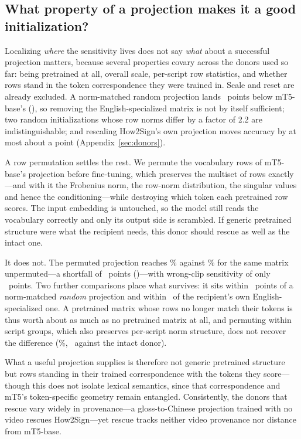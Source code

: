 \documentclass[11pt]{article}
\begin{document}
\subsection{What property of a projection makes it a good initialization?}
\label{sec:mechanism}

Localizing \emph{where} the sensitivity lives does not say \emph{what} about a
successful projection matters, because several properties covary across the
donors used so far: being pretrained at all, overall scale, per-script row
statistics, and whether rows stand in the token correspondence they were trained
in. Scale and reset are already excluded. A norm-matched random projection lands
\HeadRandVsBaseLexDeltaAbs\ points below mT5-base's (\HeadRandVsBaseLexCI), so
removing the English-specialized matrix is not by itself sufficient; two random
initializations whose row norms differ by a factor of 2.2 are indistinguishable;
and rescaling How2Sign's own projection moves accuracy by at most about a point
(Appendix~\ref{sec:donors}).

A row permutation settles the rest. We permute the vocabulary rows of mT5-base's
projection before fine-tuning, which preserves the multiset of rows exactly---and
with it the Frobenius norm, the row-norm distribution, the singular values and
hence the conditioning---while destroying which token each pretrained row scores.
The input embedding is untouched, so the model still reads the vocabulary
correctly and only its output side is scrambled. If generic pretrained structure
were what the recipient needs, this donor should rescue as well as the intact one.

It does not. The permuted projection reaches \HeadHowPermLexLocal\% against
\HeadHowBaseLexLocal\% for the same matrix unpermuted---a shortfall of
\HeadPermVsBaseLexDeltaAbs\ points (\HeadPermVsBaseLexCI)---with wrong-clip
sensitivity of only \HeadHowPermLexSwapDelta\ points. Two further comparisons
place what survives: it sits within \HeadPermVsRandLexCI\ points of a
norm-matched \emph{random} projection and within \HeadPermGainLexCI\ of the
recipient's own English-specialized one. A pretrained matrix whose rows no longer
match their tokens is thus worth about as much as no pretrained matrix at all,
and permuting within script groups, which also preserves per-script norm
structure, does not recover the difference (\HeadHowPermWsLexLocal\%,
\HeadPermWsVsBaseLexCI\ against the intact donor).

What a useful projection supplies is therefore not generic pretrained structure
but rows standing in their trained correspondence with the tokens they
score---though this does not isolate lexical semantics, since that correspondence
and mT5's token-specific geometry remain entangled. Consistently, the donors that
rescue vary widely in provenance---a gloss-to-Chinese projection trained with no
video rescues How2Sign---yet rescue tracks neither video provenance nor distance
from mT5-base.
\end{document}
